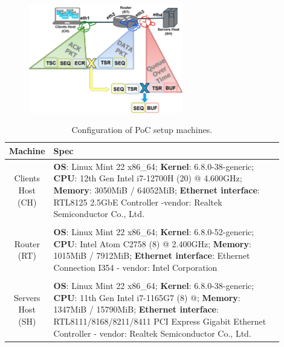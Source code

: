 \newcommand{\fngitrouterconfigscript}{%
	\footnote{The RT configuration script for setting IP routes, speed, and RTT of the connections is available in  \url{https://github.com/reisdout/git-udt/blob/main/scripts/config_router.sh}}%
}

\vspace{-3cm}

\begin{figure}[h!t]
	\centering
	\includegraphics[width=0.6\textwidth]{figure_0006.png}
	\label{fig:dumbell_poc}
\end{figure}    


\begin{table}[h]
	\centering
	\caption{Configuration of PoC setup machines.}
	\begin{tabular}{|c|m{0.9\linewidth}|}		\hline
		Machine & \hspace{0.4\linewidth}Spec \\ \hline
		Clients Host (CH) & \textbf{OS}: Linux Mint 22 x86\_64; \textbf{Kernel}: 6.8.0-38-generic; \textbf{CPU}: 12th Gen Intel i7-12700H (20) @ 4.600GHz; \textbf{Memory}: 3050MiB / 64052MiB; \textbf{Ethernet interface}: RTL8125 2.5GbE Controller -vendor: Realtek Semiconductor Co., Ltd. \\
		& \\
		Router (RT) & \textbf{OS}: Linux Mint 22 x86\_64; \textbf{Kernel}: 6.8.0-52-generic; \textbf{CPU}: Intel Atom C2758 (8) @ 2.400GHz; \textbf{Memory}: 1015MiB / 7912MiB; \textbf{Ethernet interface}: Ethernet Connection I354 - vendor: Intel Corporation \\
		&\\
		Servers Host (SH) & \textbf{OS}: Linux Mint 22 x86\_64; \textbf{Kernel}: 6.8.0-38-generic; \textbf{CPU}: 11th Gen Intel i7-1165G7 (8) @; \textbf{Memory}: 1347MiB / 15790MiB; \textbf{Ethernet interface}: RTL8111/8168/8211/8411 PCI Express Gigabit Ethernet Controller - vendor: Realtek Semiconductor Co., Ltd. \\ \hline
	\end{tabular}	
	\label{tab:poc_setup_machines_spec}
\end{table}

